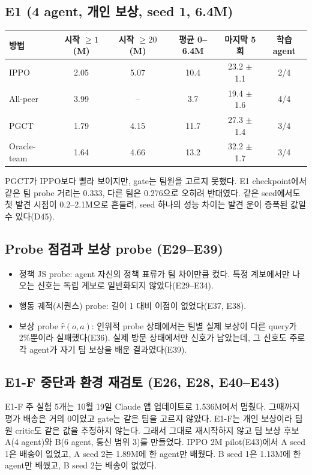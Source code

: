 \documentclass[11pt]{article}
\begin{document}
\subsection{E1 (4 agent, 개인 보상, seed 1, 6.4M)}
\begin{center}
\begin{tabular}{lccccc}
\toprule
방법 & 시작 $\ge 1$ (M) & 시작 $\ge 20$ (M) & 평균 0--6.4M & 마지막 5회 & 학습 agent \\
\midrule
IPPO & 2.05 & 5.07 & 10.4 & 23.2 $\pm$ 1.1 & 2/4 \\
All-peer & 3.99 & -- & 3.7 & 19.4 $\pm$ 1.6 & 4/4 \\
PGCT & 1.79 & 4.15 & 11.7 & 27.3 $\pm$ 1.4 & 3/4 \\
Oracle-team & 1.64 & 4.66 & 13.2 & 32.2 $\pm$ 1.7 & 3/4 \\
\bottomrule
\end{tabular}
\end{center}
PGCT가 IPPO보다 빨라 보이지만, gate는 팀원을 고르지 못했다. E1 checkpoint에서 같은 팀 probe 거리는 0.333, 다른 팀은 0.276으로 오히려 반대였다.
같은 seed에서도 첫 발견 시점이 0.2--2.1M으로 흔들려, seed 하나의 성능 차이는 발견 운이 증폭된 값일 수 있다(D45).

\subsection{Probe 점검과 보상 probe (E29--E39)}
\begin{itemize}
  \item 정책 JS probe: agent 자신의 정책 표류가 팀 차이만큼 컸다. 특정 계보에서만 나오는 신호는 독립 계보로 일반화되지 않았다(E29--E34).
  \item 행동 궤적(시퀀스) probe: 길이 1 대비 이점이 없었다(E37, E38).
  \item 보상 probe $\hat r(o,a)$: 인위적 probe 상태에서는 팀별 실제 보상이 다른 query가 2\%뿐이라 실패했다(E36). 실제 방문 상태에서만 신호가 남았는데, 그 신호도 주로 각 agent가 자기 팀 보상을 배운 결과였다(E39).
\end{itemize}

\subsection{E1-F 중단과 환경 재검토 (E26, E28, E40--E43)}
E1-F 주 실험 5개는 10월 19일 Claude 앱 업데이트로 1.536M에서 멈췄다. 그때까지 평가 배송은 거의 0이었고 gate는 같은 팀을 고르지 않았다.
E1-F는 개인 보상이라 팀원 critic도 같은 값을 추정하지 않는다. 그래서 그대로 재시작하지 않고 팀 보상 후보 A(4 agent)와 B(6 agent, 통신 범위 3)를 만들었다.
IPPO 2M pilot(E43)에서 A seed 1은 배송이 없었고, A seed 2는 1.89M에 한 agent만 배웠다. B seed 1은 1.13M에 한 agent만 배웠고, B seed 2는 배송이 없었다.
\end{document}
